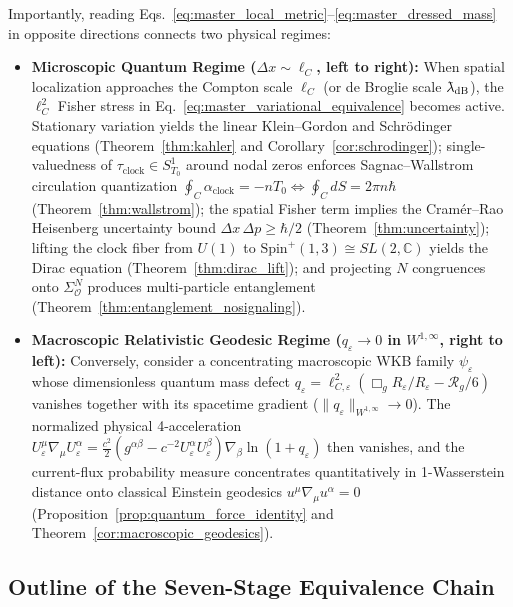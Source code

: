 \documentclass[11pt, a4paper]{article}
\theoremstyle{definition}
\providecommand{\lambdabar}{{\mkern0.75mu\mathchar'26\mkern-9.75mu\lambda}}
\begin{document}
\noindent Importantly, reading Eqs.~\eqref{eq:master_local_metric}--\eqref{eq:master_dressed_mass} in opposite directions connects two physical regimes:
\begin{itemize}[nosep]
    \item \textbf{Microscopic Quantum Regime ($\Delta x \sim \ell_C$, left to right):} When spatial localization approaches the Compton scale $\ell_C$ (or de Broglie scale $\lambdabar_{\text{dB}}$), the $\ell_C^2$ Fisher stress in Eq.~\eqref{eq:master_variational_equivalence} becomes active. Stationary variation yields the linear Klein--Gordon and Schr\"{o}dinger equations (Theorem~\ref{thm:kahler} and Corollary~\ref{cor:schrodinger}); single-valuedness of $\tau_{\text{clock}} \in S^1_{T_0}$ around nodal zeros enforces Sagnac--Wallstrom circulation quantization $\oint_C \alpha_{\text{clock}} = -n T_0 \iff \oint_C dS = 2\pi n\hbar$ (Theorem~\ref{thm:wallstrom}); the spatial Fisher term implies the Cram\'{e}r--Rao Heisenberg uncertainty bound $\Delta x\,\Delta p \ge \hbar/2$ (Theorem~\ref{thm:uncertainty}); lifting the clock fiber from $U(1)$ to $\text{Spin}^+(1,3) \cong SL(2,\mathbb{C})$ yields the Dirac equation (Theorem~\ref{thm:dirac_lift}); and projecting $N$ congruences onto $\Sigma_{\mathcal{O}}^N$ produces multi-particle entanglement (Theorem~\ref{thm:entanglement_nosignaling}).
    \item \textbf{Macroscopic Relativistic Geodesic Regime ($q_\varepsilon \to 0$ in $W^{1,\infty}$, right to left):} Conversely, consider a concentrating macroscopic WKB family $\psi_\varepsilon$ whose dimensionless quantum mass defect $q_\varepsilon = \ell_{C,\varepsilon}^2(\Box_g R_\varepsilon / R_\varepsilon - \mathcal{R}_g/6)$ vanishes together with its spacetime gradient ($\|q_\varepsilon\|_{W^{1,\infty}} \to 0$). The normalized physical 4-acceleration $U_\varepsilon^\mu\nabla_\mu U_\varepsilon^\alpha = \frac{c^2}{2}(g^{\alpha\beta} - c^{-2}U_\varepsilon^\alpha U_\varepsilon^\beta)\nabla_\beta\ln(1 + q_\varepsilon)$ then vanishes, and the current-flux probability measure concentrates quantitatively in 1-Wasserstein distance onto classical Einstein geodesics $u^\mu\nabla_\mu u^\alpha = 0$ (Proposition~\ref{prop:quantum_force_identity} and Theorem~\ref{cor:macroscopic_geodesics}).
\end{itemize}

\subsection{Outline of the Seven-Stage Equivalence Chain}
\label{sec:walkthrough}
\end{document}
